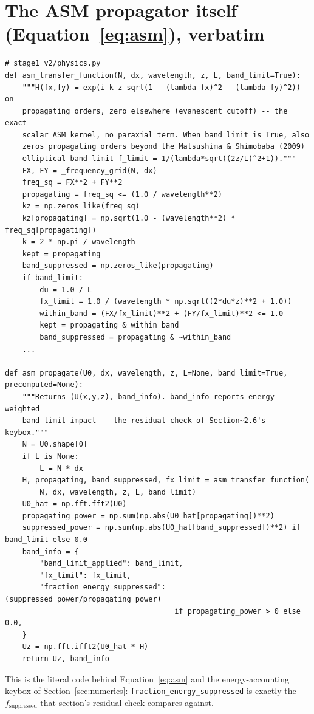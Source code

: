 \section{The ASM propagator itself (Equation~\ref{eq:asm}), verbatim}
\begin{lstlisting}[basicstyle=\ttfamily\small,breaklines=true]
# stage1_v2/physics.py
def asm_transfer_function(N, dx, wavelength, z, L, band_limit=True):
    """H(fx,fy) = exp(i k z sqrt(1 - (lambda fx)^2 - (lambda fy)^2)) on
    propagating orders, zero elsewhere (evanescent cutoff) -- the exact
    scalar ASM kernel, no paraxial term. When band_limit is True, also
    zeros propagating orders beyond the Matsushima & Shimobaba (2009)
    elliptical band limit f_limit = 1/(lambda*sqrt((2z/L)^2+1))."""
    FX, FY = _frequency_grid(N, dx)
    freq_sq = FX**2 + FY**2
    propagating = freq_sq <= (1.0 / wavelength**2)
    kz = np.zeros_like(freq_sq)
    kz[propagating] = np.sqrt(1.0 - (wavelength**2) * freq_sq[propagating])
    k = 2 * np.pi / wavelength
    kept = propagating
    band_suppressed = np.zeros_like(propagating)
    if band_limit:
        du = 1.0 / L
        fx_limit = 1.0 / (wavelength * np.sqrt((2*du*z)**2 + 1.0))
        within_band = (FX/fx_limit)**2 + (FY/fx_limit)**2 <= 1.0
        kept = propagating & within_band
        band_suppressed = propagating & ~within_band
    ...

def asm_propagate(U0, dx, wavelength, z, L=None, band_limit=True, precomputed=None):
    """Returns (U(x,y,z), band_info). band_info reports energy-weighted
    band-limit impact -- the residual check of Section~2.6's keybox."""
    N = U0.shape[0]
    if L is None:
        L = N * dx
    H, propagating, band_suppressed, fx_limit = asm_transfer_function(
        N, dx, wavelength, z, L, band_limit)
    U0_hat = np.fft.fft2(U0)
    propagating_power = np.sum(np.abs(U0_hat[propagating])**2)
    suppressed_power = np.sum(np.abs(U0_hat[band_suppressed])**2) if band_limit else 0.0
    band_info = {
        "band_limit_applied": band_limit,
        "fx_limit": fx_limit,
        "fraction_energy_suppressed": (suppressed_power/propagating_power)
                                       if propagating_power > 0 else 0.0,
    }
    Uz = np.fft.ifft2(U0_hat * H)
    return Uz, band_info
\end{lstlisting}
This is the literal code behind Equation~\ref{eq:asm} and the energy-accounting keybox
of Section~\ref{sec:numerics}: \texttt{fraction\_energy\_suppressed} is exactly the
$f_{\mathrm{suppressed}}$ that section's residual check compares against.

